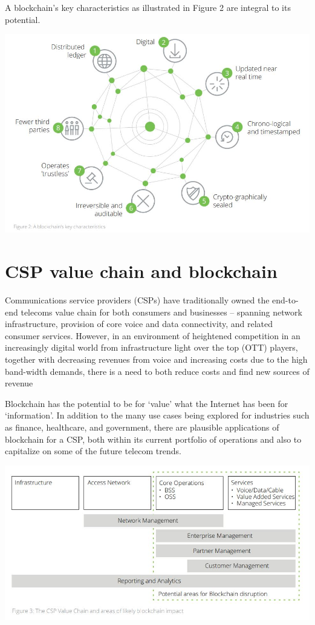 \documentclass[12pt]{article}
\begin{document}
A blockchain’s key characteristics as
illustrated in Figure 2 are integral to its
potential.

\includegraphics[width=1\textwidth]{"fig2.jpg"}

\section{CSP value chain and blockchain}

Communications service providers (CSPs)
have traditionally owned the end-to-end telecoms
value chain for both consumers and
businesses – spanning network infrastructure,
provision of core voice and data connectivity,
and related consumer services.
However, in an environment of heightened
competition in an increasingly digital world
from infrastructure light over the top (OTT)
players, together with decreasing revenues
from voice and increasing costs due to the
high band-width demands, there is a need to both reduce costs and find new sources
of revenue

Blockchain has the potential to be for ‘value’
what the Internet has been for ‘information’.
In addition to the many use cases being
explored for industries such as finance,
healthcare, and government, there are
plausible applications of blockchain for a
CSP, both within its current portfolio of
operations and also to capitalize on some of
the future telecom trends.

\includegraphics[width=1\textwidth]{"fig3.jpg"}
\end{document}
